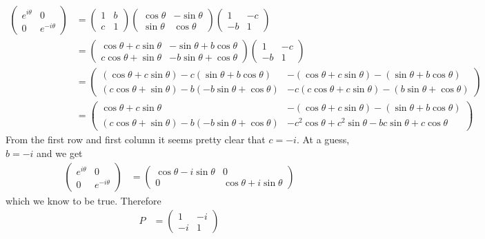 \documentclass[11pt]{amsart}
\theoremstyle{definition}  %
\begin{document}
\begin{align*}
	\left(\begin{array}{cr}
		e^{i\theta} & 0\\
		0 & e^{-i\theta} 
	\end{array}\right) &=
	\left(\begin{array}{cr}
		1 & b\\
		c & 1
	\end{array}\right)
	\left( \begin{array}{cr} \cos \theta & -\sin \theta \\ \sin \theta & \cos \theta \end{array} \right)
	\left(\begin{array}{cr}
		1 &	-c \\
		-b & 1
	\end{array}\right)\\
	&=\left( \begin{array}{cr} \cos \theta+c\sin\theta & -\sin\theta+b\cos\theta  \\ c\cos\theta+\sin\theta & -b\sin\theta+\cos \theta \end{array} \right)
	\left(\begin{array}{cr}
		1 &	-c \\
		-b & 1
	\end{array}\right)\\
	&= \left(\begin{array}{cr}
		(\cos\theta+c\sin\theta)-c(\sin\theta+b\cos\theta) & -(\cos\theta+c\sin\theta)-(\sin\theta+b\cos\theta) \\
		(c\cos\theta+\sin\theta) -b(-b\sin\theta+\cos \theta)&-c(c\cos\theta+c\sin\theta)-(b\sin\theta+\cos\theta)
	\end{array}\right) \\
	&= \left(\begin{array}{cr}
		\cos\theta+c\sin\theta & -(\cos\theta+c\sin\theta)-(\sin\theta+b\cos\theta) \\
		(c\cos\theta+\sin\theta) -b(-b\sin\theta+\cos \theta)&-c^2\cos\theta+c^2\sin\theta-bc\sin\theta+c\cos\theta
	\end{array}\right)
\end{align*}From the first row and first column it seems pretty clear that $c=-i$.  At a guess, $b=-i$ and we get
\begin{align*}
\left(\begin{array}{cc}
		e^{i\theta} & 0\\
		0 & e^{-i\theta} 
	\end{array}\right) &=\left(\begin{array}{cc}
		\cos\theta-i\sin\theta & 0 \\
		0 & \cos\theta+i\sin\theta
	\end{array}\right)
\end{align*}which we know to be true.  Therefore
\begin{align*}
	P &= \left(\begin{array}{cc}
		1 & -i\\
		-i & 1
	\end{array}\right)
\end{align*}
\end{document}
